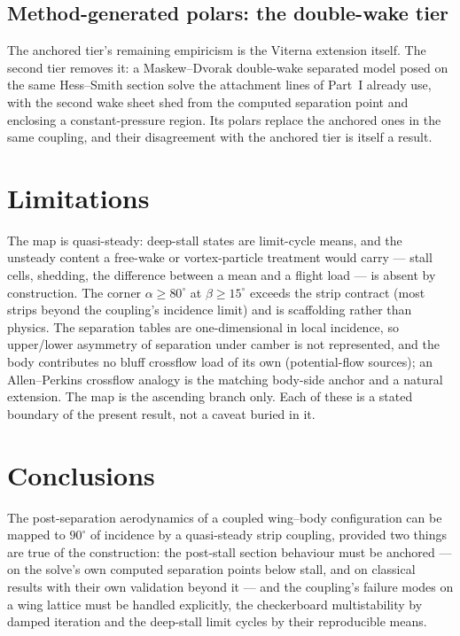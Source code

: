 \documentclass[submit]{aiaa-tc}
\begin{document}
\subsection{Method-generated polars: the double-wake tier}

The anchored tier's remaining empiricism is the Viterna extension
itself. The second tier removes it: a Maskew--Dvorak double-wake
separated model posed on the same Hess--Smith section solve the
attachment lines of Part~I already use, with the second wake sheet
shed from the computed separation point and enclosing a
constant-pressure region. Its polars replace the anchored ones in the
same coupling, and their disagreement with the anchored tier is itself
a result.

\section{Limitations}

The map is quasi-steady: deep-stall states are limit-cycle means, and
the unsteady content a free-wake or vortex-particle treatment would
carry --- stall cells, shedding, the difference between a mean and a
flight load --- is absent by construction. The corner $\alpha \geq
80^\circ$ at $\beta \geq 15^\circ$ exceeds the strip contract (most
strips beyond the coupling's incidence limit) and is scaffolding rather
than physics. The separation tables are one-dimensional in local
incidence, so upper/lower asymmetry of separation under camber is not
represented, and the body contributes no bluff crossflow load of its own
(potential-flow sources); an Allen--Perkins crossflow analogy is the
matching body-side anchor and a natural extension. The map is the
ascending branch only. Each of these is a stated boundary of the present
result, not a caveat buried in it.

\section{Conclusions}

The post-separation aerodynamics of a coupled wing--body configuration
can be mapped to $90^\circ$ of incidence by a quasi-steady strip
coupling, provided two things are true of the construction: the
post-stall section behaviour must be anchored --- on the solve's own
computed separation points below stall, and on classical results with
their own validation beyond it --- and the coupling's failure modes on a
wing lattice must be handled explicitly, the checkerboard multistability
by damped iteration and the deep-stall limit cycles by their
reproducible means.
\end{document}
